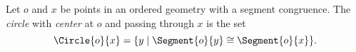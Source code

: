 \documentclass{article}
\begin{document}

\begin{dfn}[Circle]
Let $o$ and $x$ be points in an ordered geometry with a segment congruence. The \emph{circle} with \emph{center} at $o$ and passing through $x$ is the set \[ \Circle{o}{x} = \{ y \mid \Segment{o}{y} \cong \Segment{o}{x} \}. \]
\end{dfn}
\end{document}
